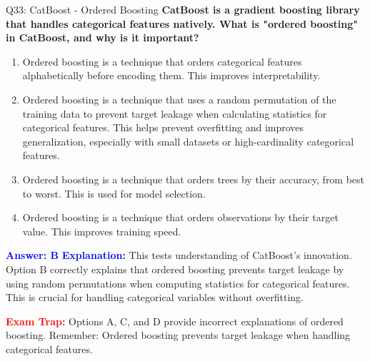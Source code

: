 \documentclass[8pt]{beamer}
\begin{document}
	\begin{frame}{Q33: CatBoost - Ordered Boosting}
		\fontsize{6.5}{7.5}\selectfont
		\textbf{CatBoost is a gradient boosting library that handles categorical features natively. What is "ordered boosting" in CatBoost, and why is it important?}
		
		\begin{enumerate}
			\item Ordered boosting is a technique that orders categorical features alphabetically before encoding them. This improves interpretability.
			\item Ordered boosting is a technique that uses a random permutation of the training data to prevent target leakage when calculating statistics for categorical features. This helps prevent overfitting and improves generalization, especially with small datasets or high-cardinality categorical features.
			\item Ordered boosting is a technique that orders trees by their accuracy, from best to worst. This is used for model selection.
			\item Ordered boosting is a technique that orders observations by their target value. This improves training speed.
		\end{enumerate}
		
		\vspace{0.1cm}
		\textcolor{blue}{\textbf{Answer: B}}
		\vspace{0.1cm}
		\textcolor{blue}{\textbf{Explanation:}} This tests understanding of CatBoost's innovation. Option B correctly explains that ordered boosting prevents target leakage by using random permutations when computing statistics for categorical features. This is crucial for handling categorical variables without overfitting.
		
		\textcolor{red}{\textbf{Exam Trap:}} Options A, C, and D provide incorrect explanations of ordered boosting. Remember: Ordered boosting prevents target leakage when handling categorical features.
	\end{frame}
	
\end{document}
